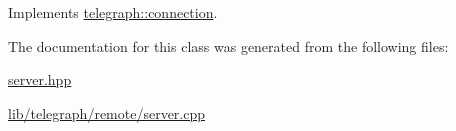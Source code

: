 Implements \hyperlink{classtelegraph_1_1connection_ad5fd2c23680ecda6e07c2f02f3735809}{telegraph\+::connection}.



The documentation for this class was generated from the following files\+:\begin{DoxyCompactItemize}
\item 
\hyperlink{server_8hpp}{server.\+hpp}\item 
\hyperlink{lib_2telegraph_2remote_2server_8cpp}{lib/telegraph/remote/server.\+cpp}\end{DoxyCompactItemize}
